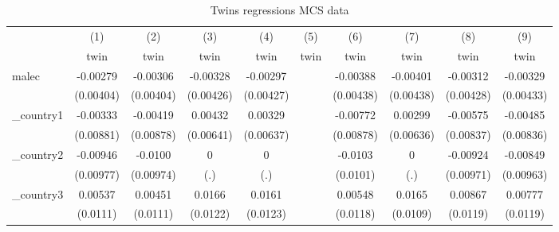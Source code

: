 \begin{table}[htbp]\centering
\def\sym#1{\ifmmode^{#1}\else\(^{#1}\)\fi}
\caption{Twins regressions MCS data}
\begin{tabular}{l*{9}{c}}
\hline\hline
            &\multicolumn{1}{c}{(1)}&\multicolumn{1}{c}{(2)}&\multicolumn{1}{c}{(3)}&\multicolumn{1}{c}{(4)}&\multicolumn{1}{c}{(5)}&\multicolumn{1}{c}{(6)}&\multicolumn{1}{c}{(7)}&\multicolumn{1}{c}{(8)}&\multicolumn{1}{c}{(9)}\\
            &\multicolumn{1}{c}{twin}&\multicolumn{1}{c}{twin}&\multicolumn{1}{c}{twin}&\multicolumn{1}{c}{twin}&\multicolumn{1}{c}{twin}&\multicolumn{1}{c}{twin}&\multicolumn{1}{c}{twin}&\multicolumn{1}{c}{twin}&\multicolumn{1}{c}{twin}\\
\hline
malec       &    -0.00279         &    -0.00306         &    -0.00328         &    -0.00297         &                     &    -0.00388         &    -0.00401         &    -0.00312         &    -0.00329         \\
            &   (0.00404)         &   (0.00404)         &   (0.00426)         &   (0.00427)         &                     &   (0.00438)         &   (0.00438)         &   (0.00428)         &   (0.00433)         \\
[1em]
\_country1   &    -0.00333         &    -0.00419         &     0.00432         &     0.00329         &                     &    -0.00772         &     0.00299         &    -0.00575         &    -0.00485         \\
            &   (0.00881)         &   (0.00878)         &   (0.00641)         &   (0.00637)         &                     &   (0.00878)         &   (0.00636)         &   (0.00837)         &   (0.00836)         \\
[1em]
\_country2   &    -0.00946         &     -0.0100         &           0         &           0         &                     &     -0.0103         &           0         &    -0.00924         &    -0.00849         \\
            &   (0.00977)         &   (0.00974)         &         (.)         &         (.)         &                     &    (0.0101)         &         (.)         &   (0.00971)         &   (0.00963)         \\
[1em]
\_country3   &     0.00537         &     0.00451         &      0.0166         &      0.0161         &                     &     0.00548         &      0.0165         &     0.00867         &     0.00777         \\
            &    (0.0111)         &    (0.0111)         &    (0.0122)         &    (0.0123)         &                     &    (0.0118)         &    (0.0109)         &    (0.0119)         &    (0.0119)         \\

\end{tabular}
\end{table}
